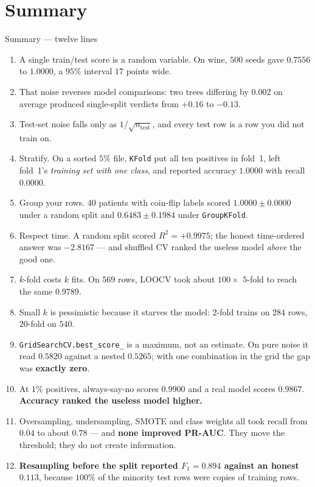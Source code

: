 \documentclass[aspectratio=169]{beamer}
\begin{document}
\section{Summary}
\label{sec:summary}

\begin{frame}[shrink=16]{Summary --- twelve lines}
  \begin{enumerate}\small
    \item A single train/test score is a random variable. On wine, $500$
      seeds gave $0.7556$ to $1.0000$, a $95\%$ interval $17$ points wide.
    \item That noise reverses model comparisons: two trees differing by
      $0.002$ on average produced single-split verdicts from $+0.16$ to
      $-0.13$.
    \item Test-set noise falls only as $1/\sqrt{n_{\text{test}}}$, and every
      test row is a row you did not train on.
    \item Stratify. On a sorted $5\%$ file, \texttt{KFold} put all ten
      positives in fold~1, left fold~1's \emph{training set with one class},
      and reported accuracy $1.0000$ with recall $0.0000$.
    \item Group your rows. $40$ patients with coin-flip labels scored
      $\mathbf{1.0000 \pm 0.0000}$ under a random split and
      $0.6483 \pm 0.1984$ under \texttt{GroupKFold}.
    \item Respect time. A random split scored $R^2 = +0.9975$; the honest
      time-ordered answer was $-2.8167$ --- and shuffled CV ranked the useless
      model \emph{above} the good one.
    \item $k$-fold costs $k$ fits. On $569$ rows, LOOCV took about
      $100\times$ $5$-fold to reach the same $0.9789$.
    \item Small $k$ is pessimistic because it starves the model:
      $2$-fold trains on $284$ rows, $20$-fold on $540$.
    \item \texttt{GridSearchCV.best\_score\_} is a maximum, not an estimate.
      On pure noise it read $0.5820$ against a nested $0.5265$; with one
      combination in the grid the gap was \textbf{exactly zero}.
    \item At $1\%$ positives, always-say-no scores $0.9900$ and a real model
      scores $0.9867$. \textbf{Accuracy ranked the useless model higher.}
    \item Oversampling, undersampling, SMOTE and class weights all took
      recall from $0.04$ to about $0.78$ --- and \textbf{none improved PR-AUC}.
      They move the threshold; they do not create information.
    \item \textbf{Resampling before the split reported $F_1 = 0.894$ against
      an honest $0.113$}, because $100\%$ of the minority test rows were
      copies of training rows.
  \end{enumerate}
\end{frame}
\end{document}
